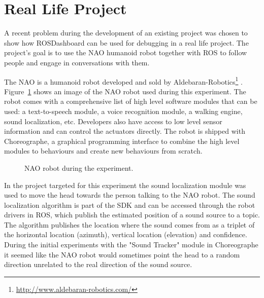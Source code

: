 \section{Real Life Project}
\label{plot_widget_section}
A recent problem during the development of an existing project was chosen to show how ROSDashboard can be used for debugging in a real life project. The project's goal is to use the NAO humanoid robot together with ROS to follow people and engage in conversations with them.

The NAO is a humanoid robot developed and sold by Aldebaran-Robotics\footnote{\url{http://www.aldebaran-robotics.com/}} \cite{Gouaillier2008}. Figure~\ref{nao_coffee} shows an image of the NAO robot used during this experiment. The robot comes with a comprehensive list of high level software modules that can be used: a text-to-speech module, a voice recognition module, a walking engine, sound localization, etc. Developers also have access to low level sensor information and can control the actuators directly. The robot is shipped with Choreographe, a graphical programming interface to combine the high level modules to behaviours and create new behaviours from scratch.

\begin{figure}[htpb]
  \centering
  \caption{NAO robot during the experiment.}
  \label{nao_coffee}
\end{figure}

In the project targeted for this experiment the sound localization module was used to move the head towards the person talking to the NAO robot. The sound localization algorithm is part of the SDK and can be accessed through the robot drivers in ROS, which publish the estimated position of a sound source to a topic. The algorithm publishes the location where the sound comes from as a triplet of the horizontal location (azimuth), vertical location (elevation) and confidence. During the initial experiments with the "Sound Tracker" module in Choreographe it seemed like the NAO robot would sometimes point the head to a random direction unrelated to the real direction of the sound source.

